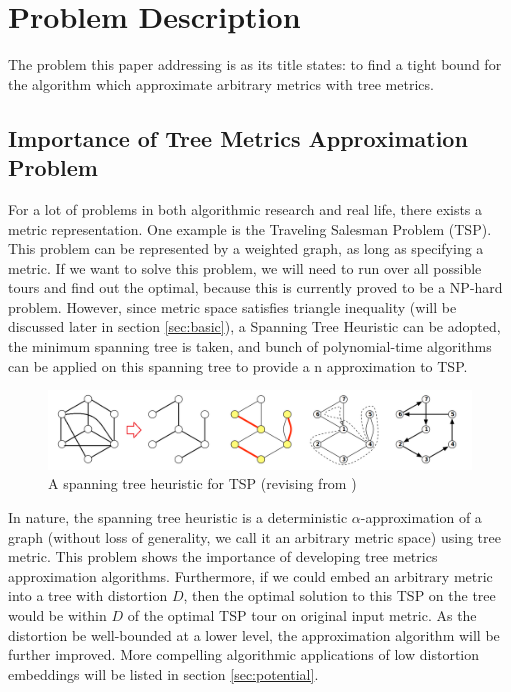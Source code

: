 \documentclass[11pt,twocolumn]{IEEEtran}
\begin{document}
\section{Problem Description}
\label{sec:desc}
The problem this paper addressing is as its title states: to find a tight bound for the algorithm 
which approximate arbitrary metrics with tree metrics.
\subsection{Importance of Tree Metrics Approximation Problem}
For a lot of problems in both algorithmic research and real life, there exists a metric representation.
One example is the Traveling Salesman Problem (TSP). This problem can be represented by a weighted graph, as long as specifying a metric. If we want to solve this
problem, we will need to run over all possible tours and find out the optimal, because this is currently
proved to be a NP-hard problem. However, since metric space satisfies triangle inequality (will be
discussed later in section \ref{sec:basic}), a Spanning Tree Heuristic\cite{h_tsp} can be adopted,
the minimum spanning tree is taken, and bunch of polynomial-time algorithms can be applied on this spanning
tree to provide a n approximation to TSP.

\begin{figure}[hbt]
	\begin{center}
	\includegraphics[scale=0.4]{h_tsp.png}
	\end{center}
	\caption{A spanning tree heuristic for TSP (revising from \cite{Jeff})}
	\label{fig:tsp}
\end{figure}

In nature, the spanning tree heuristic is a deterministic $\alpha$-approximation of a graph (without
loss of generality, we call it an arbitrary metric space) using tree metric.
This problem shows the importance of developing tree metrics approximation algorithms. Furthermore, if we could
embed an arbitrary metric into a tree with distortion $D$, then the optimal solution to this TSP
on the tree would be within $D$ of the optimal TSP tour on original input metric. As the distortion
be well-bounded at a lower level, the approximation algorithm will be further improved. More compelling
algorithmic applications of low distortion embeddings will be listed in section \ref{sec:potential}.
\end{document}
